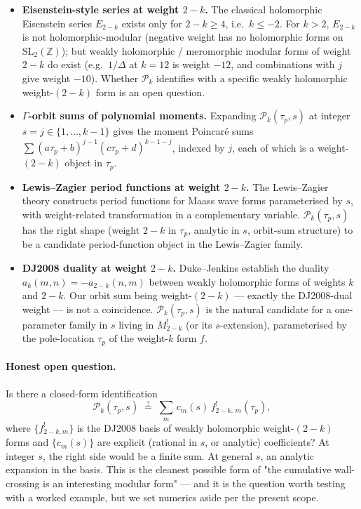 \documentclass[11pt]{article}
\newcommand{\ZZ}{\mathbb{Z}}
\newcommand{\SLZ}{\mathrm{SL}_2(\ZZ)}
\begin{document}
\begin{itemize}\itemsep0.2em
\item \textbf{Eisenstein-style series at weight $2 - k$.}  The
  classical holomorphic Eisenstein series $E_{2 - k}$ exists only for
  $2 - k \ge 4$, i.e.\ $k \le -2$.  For $k > 2$, $E_{2 - k}$ is not
  holomorphic-modular (negative weight has no holomorphic forms on
  $\SLZ$); but weakly holomorphic / meromorphic modular forms of
  weight $2 - k$ do exist (e.g.\ $1/\Delta$ at $k = 12$ is weight
  $-12$, and combinations with $j$ give weight $-10$).  Whether
  $\mathcal{P}_k$ identifies with a specific weakly holomorphic
  weight-$(2 - k)$ form is an open question.

\item \textbf{$\Gamma$-orbit sums of polynomial moments.}  Expanding
  $\mathcal{P}_k(\tau_p, s)$ at integer $s = j \in \{1, \ldots, k - 1\}$
  gives the moment Poincar\'e sums
  $\sum (a\tau_p + b)^{j - 1}(c\tau_p + d)^{k - 1 - j}$, indexed by
  $j$, each of which is a weight-$(2 - k)$ object in $\tau_p$.

\item \textbf{Lewis--Zagier period functions at weight $2 - k$.}  The
  Lewis--Zagier theory \cite{LewisZagier2001} constructs period
  functions for Maass wave forms parameterised by $s$, with
  weight-related transformation in a complementary variable.
  $\mathcal{P}_k(\tau_p, s)$ has the right shape (weight $2 - k$ in
  $\tau_p$, analytic in $s$, orbit-sum structure) to be a candidate
  period-function object in the Lewis--Zagier family.

\item \textbf{DJ2008 duality at weight $2 - k$.}  Duke--Jenkins
  \cite{DJ2008} establish the duality $a_k(m, n) = -a_{2 - k}(n, m)$
  between weakly holomorphic forms of weights $k$ and $2 - k$.  Our
  orbit sum being weight-$(2 - k)$ — exactly the DJ2008-dual weight
  — is not a coincidence.  $\mathcal{P}_k(\tau_p, s)$ is the natural
  candidate for a one-parameter family in $s$ living in $M^!_{2 - k}$
  (or its $s$-extension), parameterised by the pole-location $\tau_p$
  of the weight-$k$ form $f$.
\end{itemize}

\paragraph{Honest open question.}
Is there a closed-form identification
\[
  \mathcal{P}_k(\tau_p, s)
  \;\stackrel{?}{=}\;
  \sum_{m}\,c_m(s)\,f^!_{2 - k,\,m}(\tau_p),
\]
where $\{f^!_{2 - k, m}\}$ is the DJ2008 basis of weakly holomorphic
weight-$(2 - k)$ forms and $\{c_m(s)\}$ are explicit (rational in $s$,
or analytic) coefficients?  At integer $s$, the right side would be a
finite sum.  At general $s$, an analytic expansion in the basis.
This is the cleanest possible form of "the cumulative wall-crossing
is an interesting modular form" — and it is the question worth
testing with a worked example, but we set numerics aside per the
present scope.
\end{document}
